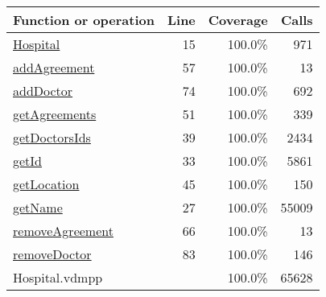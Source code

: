 \bigskip
\begin{longtable}{|l|r|r|r|}
\hline
Function or operation & Line & Coverage & Calls \\
\hline
\hline
\hyperref[Hospital:15]{Hospital} & 15&100.0\% & 971 \\
\hline
\hyperref[addAgreement:57]{addAgreement} & 57&100.0\% & 13 \\
\hline
\hyperref[addDoctor:74]{addDoctor} & 74&100.0\% & 692 \\
\hline
\hyperref[getAgreements:51]{getAgreements} & 51&100.0\% & 339 \\
\hline
\hyperref[getDoctorsIds:39]{getDoctorsIds} & 39&100.0\% & 2434 \\
\hline
\hyperref[getId:33]{getId} & 33&100.0\% & 5861 \\
\hline
\hyperref[getLocation:45]{getLocation} & 45&100.0\% & 150 \\
\hline
\hyperref[getName:27]{getName} & 27&100.0\% & 55009 \\
\hline
\hyperref[removeAgreement:66]{removeAgreement} & 66&100.0\% & 13 \\
\hline
\hyperref[removeDoctor:83]{removeDoctor} & 83&100.0\% & 146 \\
\hline
\hline
Hospital.vdmpp & & 100.0\% & 65628 \\
\hline
\end{longtable}

